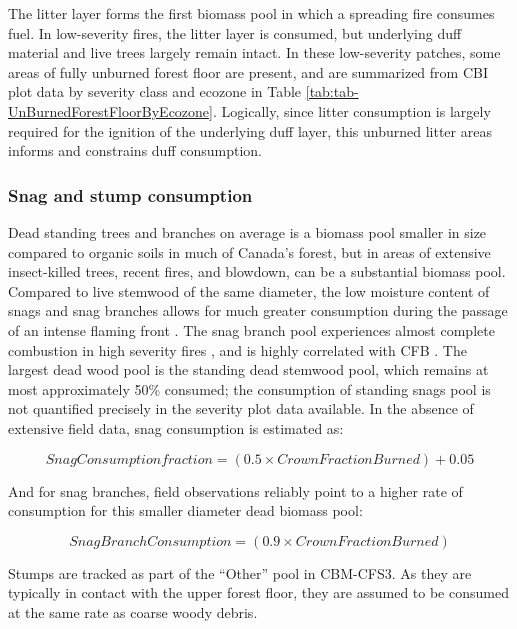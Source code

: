 \documentclass[, manuscript]{copernicus}
\begin{document}
The litter layer forms the first biomass pool in which a spreading fire
consumes fuel. In low-severity fires, the litter layer is consumed, but
underlying duff material and live trees largely remain
intact\citep{hessburg2019}. In these low-severity patches, some areas of
fully unburned forest floor are present, and are summarized from CBI
plot data by severity class and ecozone in Table
\ref{tab:tab-UnBurnedForestFloorByEcozone}. Logically, since litter
consumption is largely required for the ignition of the underlying duff
layer, this unburned litter areas informs and constrains duff
consumption.

\subsubsection{Snag and stump consumption}

Dead standing trees and branches on average is a biomass pool smaller in
size compared to organic soils in much of Canada's forest, but in areas
of extensive insect-killed trees, recent fires, and blowdown, can be a
substantial biomass pool. Compared to live stemwood of the same
diameter, the low moisture content of snags and snag branches allows for
much greater consumption during the passage of an intense flaming front
\citep{stocks2004}. The snag branch pool experiences almost complete
combustion in high severity fires \citep{talucci2019}, and is highly
correlated with CFB \citep{degroot2022}. The largest dead wood pool is
the standing dead stemwood pool, which remains at most approximately
50\% consumed; the consumption of standing snags pool is not quantified
precisely in the severity plot data available. In the absence of
extensive field data, snag consumption is estimated as:

\begin{equation}
Snag Consumption fraction = \left( 0.5 \times Crown Fraction Burned \right) + 0.05
\end{equation}

And for snag branches, field observations
\citep{talucci2019, degroot2022} reliably point to a higher rate of
consumption for this smaller diameter dead biomass pool:

\begin{equation}
Snag Branch Consumption = \left( 0.9 \times Crown Fraction Burned \right)
\end{equation}

Stumps are tracked as part of the ``Other'' pool in CBM-CFS3. As they
are typically in contact with the upper forest floor, they are assumed
to be consumed at the same rate as coarse woody debris.
\end{document}
